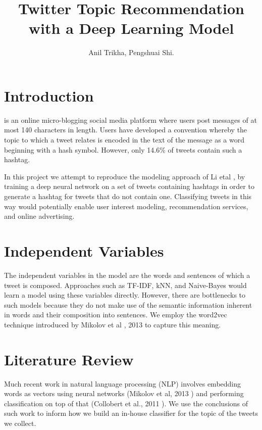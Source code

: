 \documentclass[journal, a4paper]{IEEEtran}
\begin{document}
	\title{Twitter Topic Recommendation with a Deep Learning Model}
	\author{Anil Trikha, Pengshuai Shi.}
	\maketitle

\section{Introduction}
	 is an online micro-blogging social media platform where users post messages of at most 140 characters in length. Users have developed a convention whereby the topic to which a tweet relates is encoded in the text of the message as a word beginning with a hash symbol. However, only 14.6\% of tweets contain such a hashtag.

	
	In this project we attempt to reproduce the modeling approach of Li etal \cite{Li-lstm}, by training a deep neural network on a set of tweets containing hashtags in order to generate a hashtag for tweets that do not contain one. Classifying tweets in this way would potentially enable user interest modeling, recommendation services, and online advertising.

\section{Independent Variables}
The independent variables in the model are the words and sentences of which a tweet is composed. Approaches such as TF-IDF, kNN, and Naive-Bayes would learn a model using these variables directly. However, there are bottlenecks to such models because they do not make use of the semantic information inherent in words and their composition into sentences. We employ the word2vec technique introduced by Mikolov et al \cite{word2vec}, 2013 to capture this meaning.
\section{Literature Review}
	Much recent work in natural language processing (NLP) involves embedding words as vectors using neural networks (Mikolov et al, 2013 \cite{word2vec}) and performing classification on top of that (Collobert et al., 2011 \cite{classw2v}). We use the conclusions of such work to inform how we build an in-house classifier for the topic of the tweets we collect.
\end{document}
